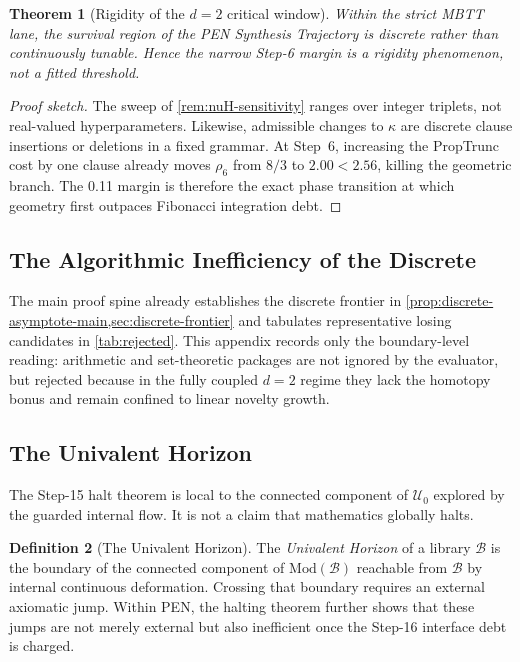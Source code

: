 \documentclass[11pt,a4paper]{article}
\theoremstyle{plain}
\newtheorem{theorem}{Theorem}[section]
\theoremstyle{definition}
\newtheorem{definition}[theorem]{Definition}
\theoremstyle{remark}
\newcommand{\U}{\mathcal{U}}
\begin{document}
\begin{theorem}[Rigidity of the $d=2$ critical window]
\label{thm:rigidity}
Within the strict MBTT lane, the survival region of the PEN Synthesis Trajectory is discrete rather than continuously tunable.
Hence the narrow Step-6 margin is a rigidity phenomenon, not a fitted threshold.
\end{theorem}

\begin{proof}[Proof sketch]
The sweep of \cref{rem:nuH-sensitivity} ranges over integer triplets, not real-valued hyperparameters.
Likewise, admissible changes to $\kappa$ are discrete clause insertions or deletions in a fixed grammar.
At Step~6, increasing the PropTrunc cost by one clause already moves $\rho_6$ from $8/3$ to $2.00 < 2.56$, killing the geometric branch.
The 0.11 margin is therefore the exact phase transition at which geometry first outpaces Fibonacci integration debt.
\end{proof}

\subsection{The Algorithmic Inefficiency of the Discrete}
\label{sec:discrete}

The main proof spine already establishes the discrete frontier in \cref{prop:discrete-asymptote-main,sec:discrete-frontier} and tabulates representative losing candidates in \cref{tab:rejected}.
This appendix records only the boundary-level reading: arithmetic and set-theoretic packages are not ignored by the evaluator, but rejected because in the fully coupled $d=2$ regime they lack the homotopy bonus and remain confined to linear novelty growth.

\subsection{The Univalent Horizon}
\label{sec:godelian}

The Step-15 halt theorem is local to the connected component of $\U_0$ explored by the guarded internal flow.
It is not a claim that mathematics globally halts.

\begin{definition}[The Univalent Horizon]
\label{def:godelian-horizon}
The \emph{Univalent Horizon} of a library $\mathcal{B}$ is the boundary of the connected component of $\mathrm{Mod}(\mathcal{B})$ reachable from $\mathcal{B}$ by internal continuous deformation.
Crossing that boundary requires an external axiomatic jump.
Within PEN, the halting theorem further shows that these jumps are not merely external but also inefficient once the Step-16 interface debt is charged.
\end{definition}
\end{document}

